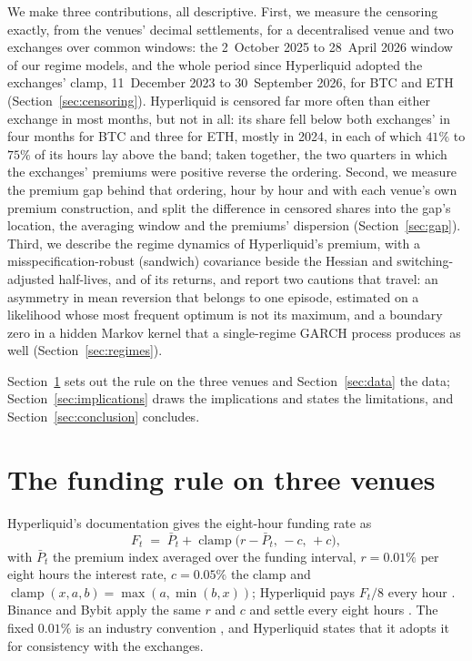 \documentclass[10pt,a4paper]{article}
\begin{document}
We make three contributions, all descriptive. First, we measure the censoring exactly, from the venues' decimal settlements, for a decentralised venue and two exchanges over common windows: the 2~October 2025 to 28~April 2026 window of our regime models, and the whole period since Hyperliquid adopted the exchanges' clamp, 11~December 2023 to 30~September 2026, for BTC and ETH (Section~\ref{sec:censoring}). Hyperliquid is censored far more often than either exchange in most months, but not in all: its share fell below both exchanges' in four months for BTC and three for ETH, mostly in 2024, in each of which $41\%$ to $75\%$ of its hours lay above the band; taken together, the two quarters in which the exchanges' premiums were positive reverse the ordering. Second, we measure the premium gap behind that ordering, hour by hour and with each venue's own premium construction, and split the difference in censored shares into the gap's location, the averaging window and the premiums' dispersion (Section~\ref{sec:gap}). Third, we describe the regime dynamics of Hyperliquid's premium, with a misspecification-robust (sandwich) covariance beside the Hessian and switching-adjusted half-lives, and of its returns, and report two cautions that travel: an asymmetry in mean reversion that belongs to one episode, estimated on a likelihood whose most frequent optimum is not its maximum, and a boundary zero in a hidden Markov kernel that a single-regime GARCH process produces as well (Section~\ref{sec:regimes}).

Section~\ref{sec:rule} sets out the rule on the three venues and Section~\ref{sec:data} the data; Section~\ref{sec:implications} draws the implications and states the limitations, and Section~\ref{sec:conclusion} concludes.

\section{The funding rule on three venues}\label{sec:rule}

Hyperliquid's documentation gives the eight-hour funding rate as
\begin{equation}\label{eq:rule}
  F_t \;=\; \bar P_t + \operatorname{clamp}\bigl(r - \bar P_t,\, -c,\, +c\bigr),
\end{equation}
with $\bar P_t$ the premium index averaged over the funding interval, $r = 0.01\%$ per eight hours the interest rate, $c = 0.05\%$ the clamp and $\operatorname{clamp}(x,a,b) = \max(a,\min(b,x))$; Hyperliquid pays $F_t/8$ every hour \citep{hyperliquid_funding_docs}. Binance and Bybit apply the same $r$ and $c$ and settle every eight hours \citep{binance_funding_docs,bybit_funding_docs}. The fixed $0.01\%$ is an industry convention \citep{amirov2026anchor}, and Hyperliquid states that it adopts it for consistency with the exchanges.
\end{document}
